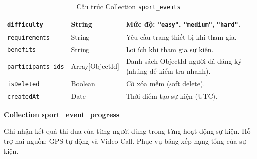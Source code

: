 \begin{table}[H]
\begin{tabularx}{\textwidth}{|p{3.8cm}|p{2.6cm}|X|}
\texttt{difficulty}       & String          & Mức độ: \texttt{"easy"}, \texttt{"medium"}, \texttt{"hard"}. \\ \hline
\rowcolor{dbrowalt}
\texttt{requirements}     & String          & Yêu cầu trang thiết bị khi tham gia. \\ \hline
\texttt{benefits}         & String          & Lợi ích khi tham gia sự kiện. \\ \hline
\rowcolor{dbrowalt}
\texttt{participants\_ids} & Array[ObjectId] & Danh sách ObjectId người đã đăng ký (nhúng để kiểm tra nhanh). \\ \hline
\texttt{isDeleted}        & Boolean         & Cờ xóa mềm (soft delete). \\ \hline
\rowcolor{dbrowalt}
\texttt{createdAt}        & Date            & Thời điểm tạo sự kiện (UTC). \\ \hline
\end{tabularx}
\caption{Cấu trúc Collection \texttt{sport\_events}}
\label{tab:col_sport_events}
\end{table}

\textbf{Collection sport\_event\_progress}
\label{subsec:col_event_progress}

Ghi nhận kết quả thi đua của từng người dùng trong từng hoạt động sự kiện. Hỗ trợ hai nguồn: GPS tự động và Video Call. Phục vụ bảng xếp hạng tổng của sự kiện.

